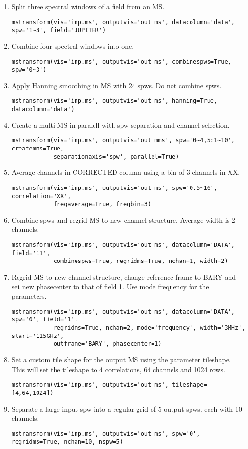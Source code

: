 \begin{enumerate}
\item Split three spectral windows of a field from an MS.
\begin{verbatim}
mstransform(vis='inp.ms', outputvis='out.ms', datacolumn='data', spw='1~3', field='JUPITER')
\end{verbatim}
\item Combine four spectral windows into one.
\begin{verbatim}
mstransform(vis='inp.ms', outputvis='out.ms', combinespws=True, spw='0~3')
\end{verbatim}
\item Apply Hanning smoothing in MS with 24 spws. Do not combine spws.
\begin{verbatim}
mstransform(vis='inp.ms', outputvis='out.ms', hanning=True, datacolumn='data')
\end{verbatim}
\item Create a multi-MS in paralell with spw separation and channel selection.
\begin{verbatim}
mstransform(vis='inp.ms', outputvis='out.mms', spw='0~4,5:1~10', createmms=True,
            separationaxis='spw', parallel=True)
\end{verbatim}
\item Average channels in CORRECTED column using a bin of 3 channels in XX.
\begin{verbatim}
mstransform(vis='inp.ms', outputvis='out.ms', spw='0:5~16', correlation='XX', 
            freqaverage=True, freqbin=3)
\end{verbatim}
\item Combine spws and regrid MS to new channel structure. Average width is 2 channels.
\begin{verbatim}
mstransform(vis='inp.ms', outputvis='out.ms', datacolumn='DATA', field='11',
            combinespws=True, regridms=True, nchan=1, width=2)
\end{verbatim}
\item Regrid MS to new channel structure, change reference frame to BARY and set
new phasecenter to that of field 1. Use mode frequency for the parameters.
\begin{verbatim}
mstransform(vis='inp.ms', outputvis='out.ms', datacolumn='DATA', spw='0', field='1', 
            regridms=True, nchan=2, mode='frequency', width='3MHz', start='115GHz', 
            outframe='BARY', phasecenter=1)
\end{verbatim}
\item Set a custom tile shape for the output MS using the parameter tileshape. This will
set the tileshape to 4 correlations, 64 channels and 1024 rows.
\begin{verbatim}
mstransform(vis='inp.ms', outputvis='out.ms', tileshape=[4,64,1024])
\end{verbatim}
\item Separate a large input spw into a regular grid of 5 output spws, each with 10 channels.
\begin{verbatim}
mstransform(vis='inp.ms', outputvis='out.ms', spw='0', regridms=True, nchan=10, nspw=5)
\end{verbatim}




\end{enumerate}
